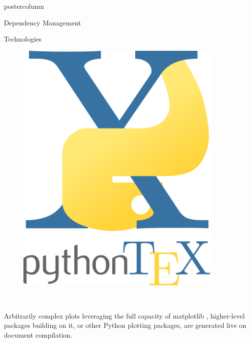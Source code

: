 \documentclass[xcolor=table]{beamer}
\begin{document}
\begin{frame}
\begin{columns}
\begin{column}{.43\textwidth}
\begin{beamercolorbox}[center]{postercolumn}
\begin{minipage}{.98\textwidth}
{\begin{myblock}{Dependency Management}
					\end{myblock}\vfill
					\vspace{-0.3em}
					\begin{myblock}{Technologies}
						\vspace{0.75em}
						\begin{minipage}{.28\textwidth}
							\begin{figure}
								\includegraphics[width=0.9\textwidth]{img/pythontex}
							\end{figure}
						\end{minipage}~
						\begin{minipage}{.68\textwidth}
							Arbitrarily complex plots leveraging the full capacity of matplotlib \cite{matplotlib}, higher-level packages building on it, or other Python plotting packages, are generated live on document compilation.
							\vspace{0.6em}


\end{minipage}
\end{myblock}}
\end{minipage}
\end{beamercolorbox}
\end{column}
\end{columns}
\end{frame}
\end{document}
